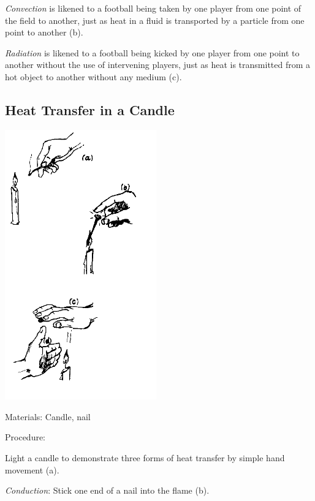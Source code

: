 \begin{multicols}{2}
\emph{Convection} is likened to a football being taken by one player from one point of the field to another, just as heat in a fluid is transported by a particle from one point to another (b).

\emph{Radiation} is likened to a football being kicked by one player from one point to another without the use of intervening players, just as heat is transmitted from a hot object to another without any medium (c).

\vfill
\columnbreak

\subsection{Heat Transfer in a Candle}

\begin{center}
\includegraphics[width=0.49\textwidth]{./img/source/heat-trans-candle.png}
\end{center}

\begin{description*}
\item[Materials:]{Candle, nail}
\item[Procedure:]{Light a candle to demonstrate three forms of heat transfer by simple hand movement (a). 

\emph{Conduction}: Stick one end of a nail into the flame (b). 

}
\end{description*}
\end{multicols}
